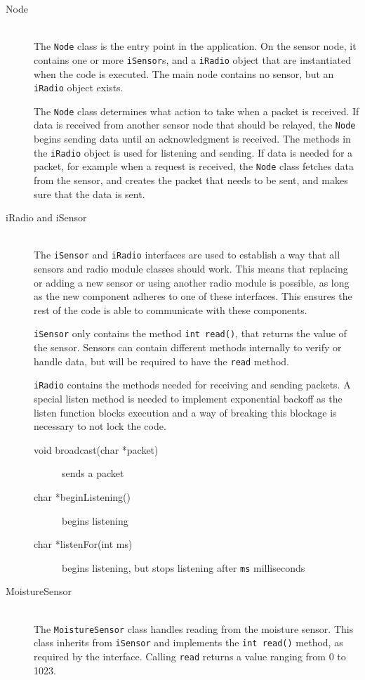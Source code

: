 \begin{description}
\item[Node] \hfill \\
The \texttt{Node} class is the entry point in the application.
On the sensor node, it contains one or more \texttt{iSensor}s, and a \texttt{iRadio} object that are instantiated when the code is executed. The main node contains no sensor, but an \texttt{iRadio} object exists.

The \texttt{Node} class determines what action to take when a packet is received. If data is received from another sensor node that should be relayed, the \texttt{Node} begins sending data until an acknowledgment is received. The methods in the \texttt{iRadio} object is used for listening and sending.
If data is needed for a packet, for example when a request is received, the \texttt{Node} class fetches data from the sensor, and creates the packet that needs to be sent, and makes sure that the data is sent.

\item[iRadio and iSensor] \hfill \\
The \texttt{iSensor} and \texttt{iRadio} interfaces are used to establish a way that all sensors and radio module classes should work. This means that replacing or adding a new sensor or using another radio module is possible, as long as the new component adheres to one of these interfaces. This ensures the rest of the code is able to communicate with these components.

\texttt{iSensor} only contains the method \texttt{int read()}, that returns the value of the sensor. Sensors can contain different methods internally to verify or handle data, but will be required to have the \texttt{read} method.

\texttt{iRadio} contains the methods needed for receiving and sending packets. A special listen method is needed to implement exponential backoff as the listen function blocks execution and a way of breaking this blockage is necessary to not lock the code.
\begin{description}
\item[void broadcast(char *packet)] sends a packet
\item[char *beginListening()] begins listening
\item[char *listenFor(int ms)] begins listening, but stops listening after \texttt{ms} milliseconds
\end{description}

\item[MoistureSensor] \hfill \\
The \texttt{MoistureSensor} class handles reading from the moisture sensor. This class inherits from \texttt{iSensor} and implements the \texttt{int read()} method, as required by the interface. Calling \texttt{read} returns a value ranging from 0 to 1023.


\end{description}
